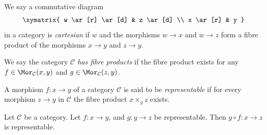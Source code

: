 \begin{definition}
\label{definition-cartesian}
We say a commutative diagram
$$
\xymatrix{
w \ar[r] \ar[d] &
z \ar[d] \\
x \ar[r] &
y
}
$$
in a category is {\it cartesian} if $w$ and the morphisms $w \to x$ and
$w \to z$ form a fibre product of the morphisms $x \to y$ and $z \to y$.
\end{definition}

\begin{definition}
\label{definition-has-fibre-products}
We say the category $\mathcal{C}$ {\it has fibre products} if
the fibre product exists for any $f\in \Mor_{\mathcal C}(x, y)$
and $g\in \Mor_{\mathcal C}(z, y)$.
\end{definition}

\begin{definition}
\label{definition-representable-morphism}
A morphism $f : x \to y$ of a category $\mathcal{C}$ is said to be
{\it representable} if for every morphism $z \to y$
in $\mathcal{C}$ the fibre product $x \times_y z$ exists.
\end{definition}

\begin{lemma}
\label{lemma-composition-representable}
Let $\mathcal{C}$ be a category.
Let $f : x \to y$, and $g : y \to z$ be representable.
Then $g \circ f : x \to z$ is representable.
\end{lemma}

